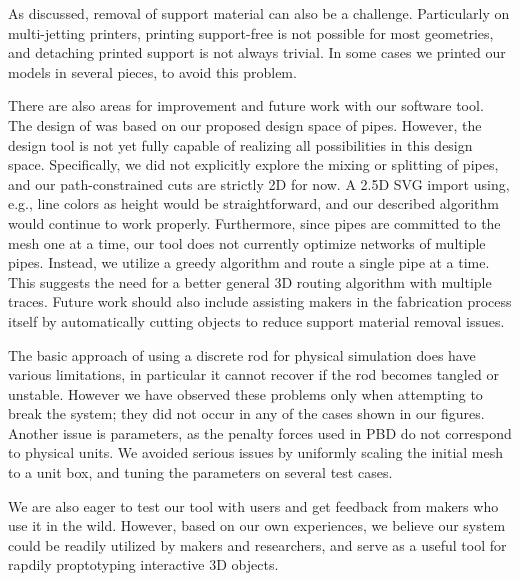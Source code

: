 As discussed, removal of support material can also be a challenge.  Particularly on multi-jetting printers, printing support-free is not possible for most geometries, and detaching printed support is not always trivial. In some cases we printed our models in several pieces, to avoid this problem. 

There are also areas for improvement and future work with our software tool.  The design of \systemname was based on our proposed design space of pipes.  However, the design tool is not yet fully capable of realizing all possibilities in this design space.  Specifically, we did not explicitly explore the mixing or splitting of pipes, and our path-constrained cuts are strictly 2D for now.  A 2.5D SVG import using, e.g., line colors as height would be straightforward, and our described algorithm would continue to work properly.  Furthermore, since pipes are committed to the mesh one at a time, our tool does not currently optimize networks of multiple pipes. Instead, we utilize a greedy algorithm and route a single pipe at a time.  This suggests the need for a better general 3D routing algorithm with multiple traces.  Future work should also include assisting makers in the fabrication process itself by automatically cutting objects to reduce support material removal issues. %

The basic approach of using a discrete rod for physical simulation does have various limitations, in particular it
cannot recover if the rod becomes tangled or unstable. 
However we have observed these problems only when attempting to break
the system; they did not occur in any of the cases shown in our figures.
Another issue is parameters, as the penalty forces used in PBD do not
correspond to physical units. We avoided serious issues by uniformly
scaling the initial mesh to a unit box, and tuning the parameters on several test cases.

We are also eager to test our tool with users and get feedback from makers who use it in the wild. However, based on our own experiences, we believe our system could be readily utilized by makers and researchers, and serve as a useful tool for rapdily proptotyping interactive 3D objects.
